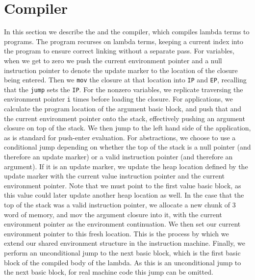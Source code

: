 \section{Compiler} \label{sec:compiler}

In this section we describe the and the compiler, which compiles lambda terms to
programs. The program recurses on lambda terms, keeping a current index into the
program to ensure correct linking without a separate pass. For variables, when
we get to zero we push the current environment pointer and a null instruction
pointer to denote the update marker to the location of the closure being
entered. Then we \texttt{mov} the closure at that location into \texttt{IP} and
\texttt{EP}, recalling that the \texttt{jump} sets the \texttt{IP}. For the
nonzero variables, we replicate traversing the environment pointer \texttt{i}
times before loading the closure. For applications, we calculate the program
location of the argument basic block, and push that and the current environment
pointer onto the stack, effectively pushing an argument closure on top of the
stack. We then jump to the left hand side of the application, as is standard for
push-enter evaluation. For abstractions, we choose to use a conditional jump
depending on whether the top of the stack is a null pointer (and therefore an
update marker) or a valid instruction pointer (and therefore an argument). If it
is an update marker, we update the heap location defined by the update marker
with the current value instruction pointer and the current environment pointer.
Note that we must point to the first value basic block, as this value could
later update another heap location as well. In the case that the top of the
stack was a valid instruction pointer, we allocate a new chunk of 3 word of
memory, and mov the argument closure into it, with the current environment
pointer as the environment continuation. We then set our current environment
pointer to this fresh location. This is the process by which we extend our
shared environment structure in the instruction machine. Finally, we perform an
unconditional jump to the next basic block, which is the first basic block of
the compiled body of the lambda. As this is an unconditional jump to the next
basic block, for real machine code this jump can be omitted. 

